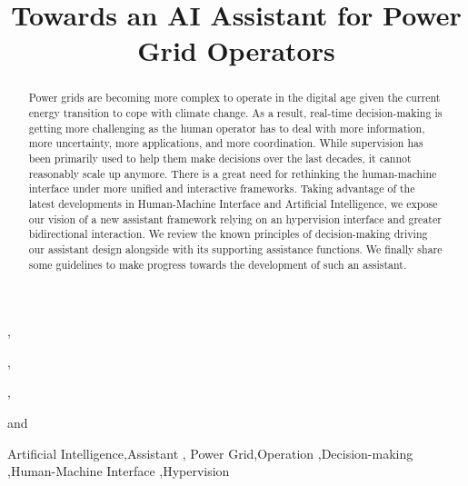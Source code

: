 \documentclass{IOS-Book-Article}
\def\hb{\hbox to 11.5 cm{}}
\begin{document}
\pagestyle{headings}
\def\thepage{}

\begin{frontmatter}              %


\title{Towards an AI Assistant for Power Grid Operators}%

\markboth{}{June 2021\hb}

\author[A]{ }, %
\author[A]{ },
\author[A]{ },
\author[A]{ }
and \author[A]{ }

\address[A]{RTE, R\&D and AI Lab, France}

\begin{abstract}
Power grids are becoming more complex to operate in the digital age given the current energy transition to cope with climate change. As a result, real-time decision-making is getting more challenging as the human operator has to deal with more information, more uncertainty, more applications, and more coordination. While supervision has been primarily used to help them make decisions over the last decades, it cannot reasonably scale up anymore. There is a great need for rethinking the human-machine interface under more unified and interactive frameworks. Taking advantage of the latest developments in Human-Machine Interface and Artificial Intelligence, we expose our vision of a new assistant framework relying on an hypervision interface and greater bidirectional interaction. We review the known principles of decision-making driving our assistant design alongside with its supporting assistance functions. We finally share some guidelines to make progress towards the development of such an assistant.
\end{abstract}

\begin{keyword}
Artificial Intelligence\sep Assistant \sep
Power Grid\sep Operation \sep Decision-making \sep Human-Machine Interface \sep Hypervision
\end{keyword}
\end{frontmatter}
\markboth{June 2022\hb}{June 2022\hb}
\end{document}
